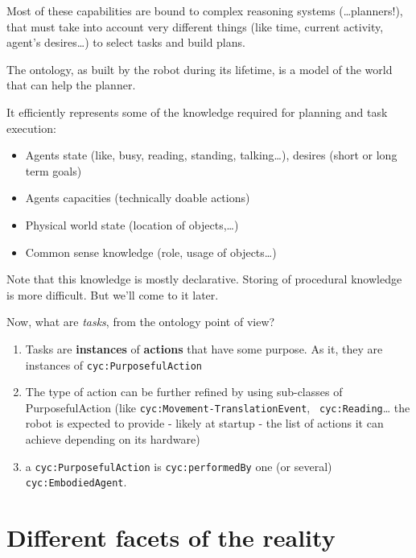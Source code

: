 Most of these capabilities are bound to complex reasoning systems
(\ldots{}planners!), that must take into account very different things (like
time, current activity, agent's desires\ldots{}) to select tasks and build
plans.

The ontology, as built by the robot during its lifetime, is a model of the
world that can help the planner.

It efficiently represents some of the knowledge required for planning and task
execution:


\begin{itemize}

\item  Agents state (like, busy, reading, standing, talking\ldots{}), desires
(short or long term goals)

\item  Agents capacities (technically doable actions)

\item  Physical world state (location of objects,\ldots{})

\item  Common sense knowledge (role, usage of objects\ldots{})

\end{itemize}

Note that this knowledge is mostly declarative. Storing of procedural knowledge
is more difficult. But we'll come to it later.

Now, what are \emph{tasks}, from the ontology point of view?


\begin{enumerate}

\item  Tasks are {\bf instances} of {\bf actions} that have some purpose. As
it, they are instances of {\tt cyc:PurposefulAction}

\item  The type of action can be further refined by using sub-classes of
PurposefulAction (like {\tt cyc:Movement-TranslationEvent}, {\tt
cyc:Reading}\ldots{} the robot is expected to provide - likely at startup - the
list of actions it can achieve depending on its hardware)

\item  a {\tt cyc:PurposefulAction} is {\tt cyc:performedBy} one (or several)
{\tt cyc:EmbodiedAgent}.

\end{enumerate}

\section{Different facets of the reality}

